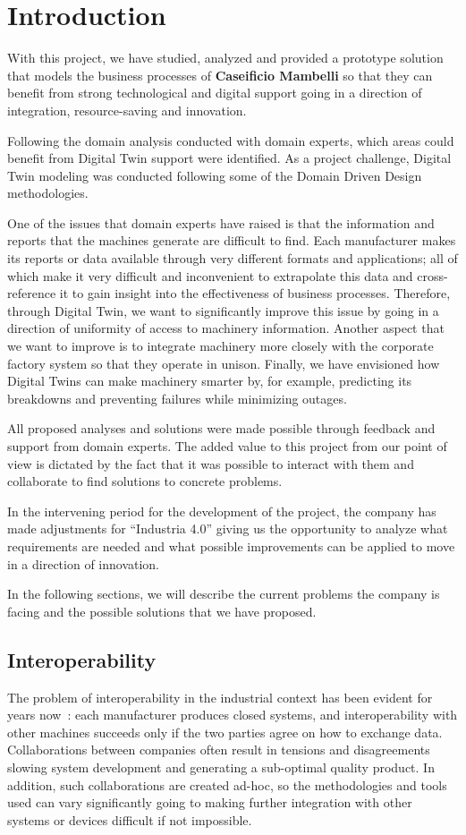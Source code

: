 \chapter{Introduction}
With this project, we have studied, analyzed and provided a prototype solution that models the business processes of \textbf{Caseificio Mambelli} so
that they can benefit from strong technological and digital support going in a direction of integration, resource-saving and innovation.

Following the domain analysis conducted with domain experts, which areas could benefit from Digital Twin support were identified.
As a project challenge, Digital Twin modeling was conducted following some of the Domain Driven Design methodologies.

One of the issues that domain experts have raised is that the information and reports that the machines generate are difficult to find.
Each manufacturer makes its reports or data available through very different formats and applications; all of which make it very difficult
and inconvenient to extrapolate this data and cross-reference it to gain insight into the effectiveness of business processes.
Therefore, through Digital Twin, we want to significantly improve this issue by going in a direction of uniformity of access to machinery
information.
Another aspect that we want to improve is to integrate machinery more closely with the corporate factory system so that they operate in unison.
Finally, we have envisioned how Digital Twins can make machinery smarter by, for example, predicting its breakdowns and preventing failures while
minimizing outages.

All proposed analyses and solutions were made possible through feedback and support from domain experts.
The added value to this project from our point of view is dictated by the fact that it was possible to interact with them and collaborate to find
solutions to concrete problems.

In the intervening period for the development of the project, the company has made adjustments for ``Industria 4.0'' giving us the opportunity to
analyze what requirements are needed and what possible improvements can be applied to move in a direction of innovation.


In the following sections, we will describe the current problems the company is facing and the possible solutions that we have proposed.

\section{Interoperability}
The problem of interoperability in the industrial context has been evident for years now~\cite{LIAO201712434}: each manufacturer produces closed systems, and interoperability with other machines succeeds only if the two parties agree on how to exchange data.
Collaborations between companies often result in tensions and disagreements slowing system development and generating a sub-optimal quality product.
In addition, such collaborations are created ad-hoc, so the methodologies and tools used can vary significantly going to making further integration
with other systems or devices difficult if not impossible.

